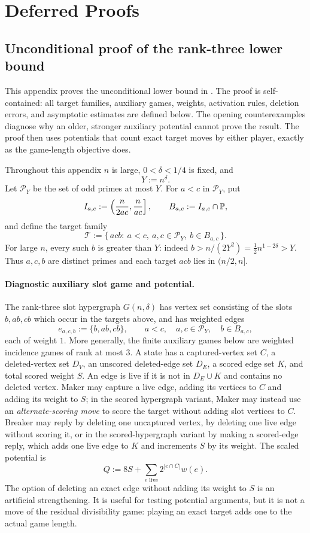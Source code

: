 \section{Deferred Proofs}\label{app:deferred-proofs}

\subsection{Unconditional proof of the rank-three lower bound}\label{app:t2-proof}

This appendix proves the unconditional lower bound in .  The proof
is self-contained: all target families, auxiliary games, weights, activation
rules, deletion errors, and asymptotic estimates are defined below.  The
opening counterexamples diagnose why an older, stronger auxiliary potential
cannot prove the result.  The proof then uses potentials that count exact
target moves by either player, exactly as the game-length objective does.

Throughout this appendix $n$ is large, $0<\delta<1/4$ is fixed, and
\[
  Y:=n^\delta.
\]
Let $\mathcal P_Y$ be the set of odd primes at most $Y$.  For
$a<c$ in $\mathcal P_Y$, put
\[
  I_{a,c}:=\left(\frac{n}{2ac},\frac{n}{ac}\right],
  \qquad
  B_{a,c}:=I_{a,c}\cap\mathbb{P},
\]
and define the target family
\[
  \mathcal T
  :=
  \{\,acb:\ a<c,\ a,c\in\mathcal P_Y,\ b\in B_{a,c}\,\}.
\]
For large $n$, every such $b$ is greater than $Y$: indeed
$b>n/(2Y^2)=\frac12 n^{1-2\delta}>Y$.  Thus $a,c,b$ are distinct primes and
each target $acb$ lies in $(n/2,n]$.

\paragraph{Diagnostic auxiliary slot game and potential.}
The rank-three slot hypergraph $G(n,\delta)$ has vertex set consisting
of the slots $b,ab,cb$ which occur in the targets above, and has weighted edges
\[
  e_{a,c,b}:=\{b,ab,cb\},
  \qquad
  a<c,\quad a,c\in\mathcal P_Y,\quad b\in B_{a,c},
\]
each of weight $1$.  More generally, the finite auxiliary games below are
weighted incidence games of rank at most $3$.  A state has a captured-vertex set
$C$, a deleted-vertex set $D_V$, an unscored deleted-edge set $D_E$, a scored
edge set $K$, and total scored weight $S$.  An edge is live if it is not in
$D_E\cup K$ and contains no deleted vertex.  Maker may capture a live edge,
adding its vertices to $C$ and adding its weight to $S$; in the scored
hypergraph variant, Maker may instead use an \emph{alternate-scoring move} to
score the target without adding slot vertices to $C$.  Breaker may reply by
deleting one uncaptured vertex, by deleting one live edge without scoring it, or
in the scored-hypergraph variant by making a scored-edge reply, which adds one
live edge to $K$ and increments $S$ by its weight.  The scaled potential is
\[
  Q:=8S+\sum_{e\text{ live}}2^{|e\cap C|}w(e).
\]
The option of deleting an exact edge without adding its weight to $S$ is an
artificial strengthening.  It is useful for testing potential arguments, but
it is not a move of the residual divisibility game: playing an exact target
adds one to the actual game length.

